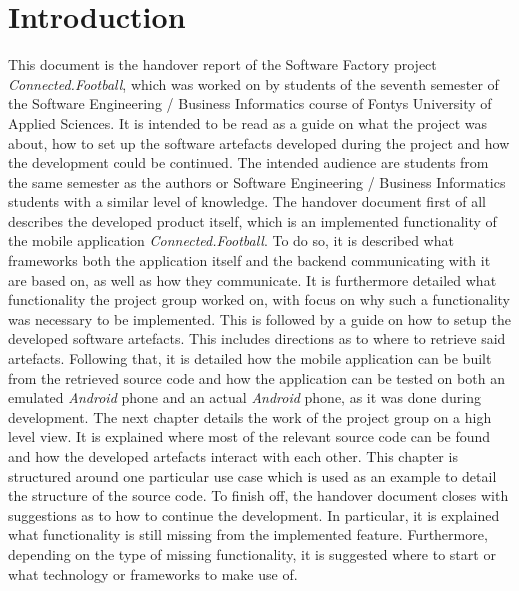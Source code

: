 \section{Introduction}
\label{sec:introduction}

This document is the handover report of the Software Factory project \textit{Connected.Football}, which was worked on by students of the seventh semester of the Software Engineering / Business Informatics course of Fontys University of Applied Sciences. It is intended to be read as a guide on what the project was about, how to set up the software artefacts developed during the project and how the development could be continued. The intended audience are students from the same semester as the authors or Software Engineering / Business Informatics students with a similar level of knowledge.
\newline
The handover document first of all describes the developed product itself, which is an implemented functionality of the mobile application \textit{Connected.Football}. To do so, it is described what frameworks both the application itself and the backend communicating with it are based on, as well as how they communicate. It is furthermore detailed what functionality the project group worked on, with focus on why such a functionality was necessary to be implemented.
\newline
This is followed by a guide on how to setup the developed software artefacts. This includes directions as to where to retrieve said artefacts. Following that, it is detailed how the mobile application can be built from the retrieved source code and how the application can be tested on both an emulated \textit{Android} phone and an actual \textit{Android} phone, as it was done during development.
\newline
The next chapter details the work of the project group on a high level view. It is explained where most of the relevant source code can be found and how the developed artefacts interact with each other. This chapter is structured around one particular use case which is used as an example to detail the structure of the source code.
\newline
To finish off, the handover document closes with suggestions as to how to continue the development. In particular, it is explained what functionality is still missing from the implemented feature. Furthermore, depending on the type of missing functionality, it is suggested where to start or what technology or frameworks to make use of.